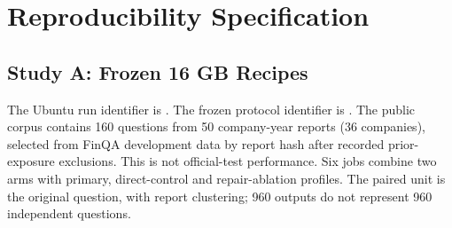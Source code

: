 \documentclass{article}
\begin{document}
\section{Reproducibility Specification}
\subsection{Study A: Frozen 16 GB Recipes}
The Ubuntu run identifier is . The frozen protocol identifier is . The public corpus contains 160 questions from 50 company-year reports (36 companies), selected from FinQA development data by report hash after recorded prior-exposure exclusions. This is not official-test performance. Six jobs combine two arms with primary, direct-control and repair-ablation profiles. The paired unit is the original question, with report clustering; 960 outputs do not represent 960 independent questions.
\end{document}
